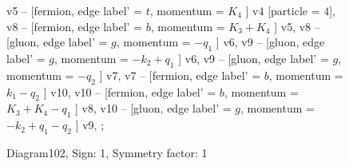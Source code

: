 \documentclass{revtex4}
\begin{document}
\begin{figure}[!htb]
\begin{center}
{v5 -- [fermion, edge label' = \(t\), momentum = \(K_{4}\) ] v4 [particle = \(4\)], 
v8 -- [fermion, edge label' = \(b\), momentum = \(K_{3} + K_{4}\) ] v5, 
v8 -- [gluon, edge label' = \(g\), momentum = \(-q_{1}\) ] v6, 
v9 -- [gluon, edge label' = \(g\), momentum = \(-k_{2} + q_{1}\) ] v6, 
v9 -- [gluon, edge label' = \(g\), momentum = \(-q_{2}\) ] v7, 
v7 -- [fermion, edge label' = \(b\), momentum = \(k_{1} - q_{2}\) ] v10, 
v10 -- [fermion, edge label' = \(b\), momentum = \(K_{3} + K_{4} - q_{1}\) ] v8, 
v10 -- [gluon, edge label' = \(g\), momentum = \(-k_{2} + q_{1} - q_{2}\) ] v9, 
};
\end{center}
\caption{Diagram102, Sign: 1, Symmetry factor: 1}
\end{figure}
\newpage
\end{document}

